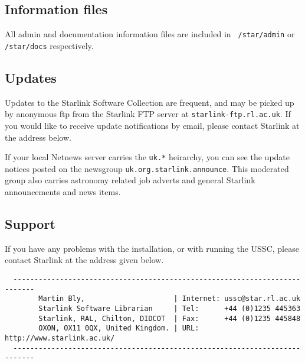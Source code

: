 \subsection{Information files}
\label{s:info:files}

All admin and documentation information files are included in {\tt
/star/admin} or {\tt /star/docs} respectively.

\subsection{Updates}
\label{s:info:updates}

Updates to the Starlink Software Collection are frequent, and may be
picked up by anonymous ftp from the Starlink FTP server at
{\tt starlink-ftp.rl.ac.uk}.  If you would like to receive update
notifications by email, please contact Starlink at the address below.

If your local Netnews server carries the {\tt uk.*} heirarchy, you can 
see the update notices posted on the newsgroup {\tt uk.org.starlink.announce}.
This moderated group also carries astronomy related job adverts and
general Starlink announcements and news items.

\subsection{Support}
\label{s:info:help}

If you have any problems with the installation, or with running the
USSC, please contact Starlink at the address given below.

\begin{verbatim}
  ---------------------------------------------------------------------------
        Martin Bly,                     | Internet: ussc@star.rl.ac.uk
        Starlink Software Librarian     | Tel:      +44 (0)1235 445363
        Starlink, RAL, Chilton, DIDCOT  | Fax:      +44 (0)1235 445848
        OXON, OX11 0QX, United Kingdom. | URL:  http://www.starlink.ac.uk/
  ---------------------------------------------------------------------------
\end{verbatim}


